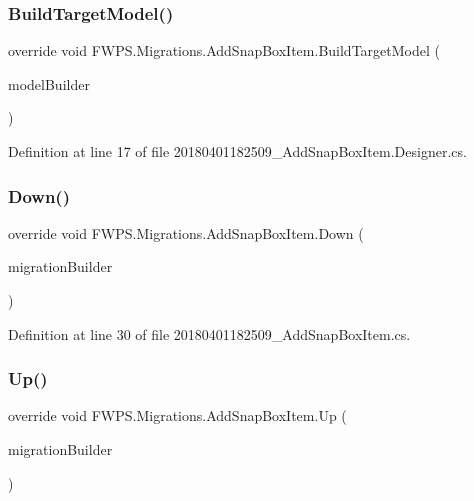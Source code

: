 \subsubsection{\texorpdfstring{Build\+Target\+Model()}{BuildTargetModel()}}
{\footnotesize\ttfamily override void F\+W\+P\+S.\+Migrations.\+Add\+Snap\+Box\+Item.\+Build\+Target\+Model (\begin{DoxyParamCaption}\item[{Model\+Builder}]{model\+Builder }\end{DoxyParamCaption})\hspace{0.3cm}{\ttfamily [protected]}}



Definition at line 17 of file 20180401182509\+\_\+\+Add\+Snap\+Box\+Item.\+Designer.\+cs.

\mbox{\label{class_f_w_p_s_1_1_migrations_1_1_add_snap_box_item_af8e8ffea8a734c62158a56b2ee04203e}} 
\subsubsection{\texorpdfstring{Down()}{Down()}}
{\footnotesize\ttfamily override void F\+W\+P\+S.\+Migrations.\+Add\+Snap\+Box\+Item.\+Down (\begin{DoxyParamCaption}\item[{Migration\+Builder}]{migration\+Builder }\end{DoxyParamCaption})\hspace{0.3cm}{\ttfamily [protected]}}



Definition at line 30 of file 20180401182509\+\_\+\+Add\+Snap\+Box\+Item.\+cs.

\mbox{\label{class_f_w_p_s_1_1_migrations_1_1_add_snap_box_item_a1803590671da458cf29631e5496dc143}} 
\subsubsection{\texorpdfstring{Up()}{Up()}}
{\footnotesize\ttfamily override void F\+W\+P\+S.\+Migrations.\+Add\+Snap\+Box\+Item.\+Up (\begin{DoxyParamCaption}\item[{Migration\+Builder}]{migration\+Builder }\end{DoxyParamCaption})\hspace{0.3cm}{\ttfamily [protected]}}



